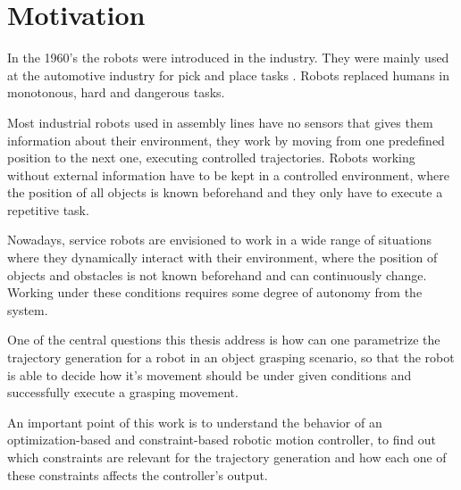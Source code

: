 \section{Motivation}
In the 1960's the robots were introduced in the industry. They were mainly used at the automotive industry for pick and place tasks  \citep{history}. Robots replaced humans in monotonous, hard and dangerous tasks. 

Most industrial robots used in assembly lines have no sensors that gives them information about their environment, they work by moving from one predefined position to the next one, executing controlled trajectories. Robots working without external information have to be kept in a controlled environment, where the position of all objects is known beforehand and they only have to execute a repetitive task.

Nowadays, service robots are envisioned to work in a wide range of situations where they dynamically interact with their environment, where the position of objects and obstacles is not known beforehand and can continuously change. Working under these conditions requires some degree of autonomy from the system.

One of the central questions this thesis address is how can one parametrize the trajectory generation for a robot in an object grasping scenario, so that the robot is able to decide how it's movement should be under given conditions and successfully execute a grasping movement.

An important point of this work is to understand the behavior of an optimization-based and constraint-based robotic motion controller, to find out which constraints are relevant for the trajectory generation and how each one of these constraints affects the controller's output.

